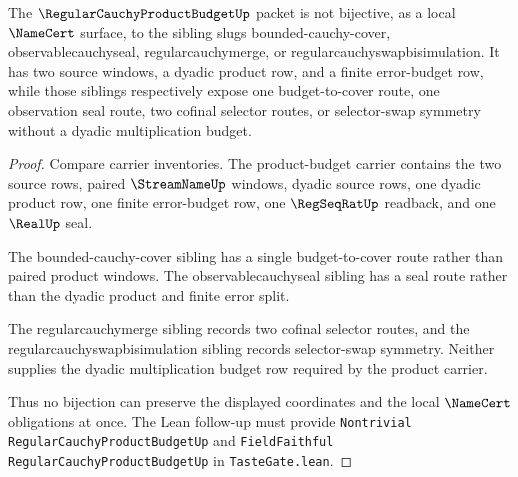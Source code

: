 \begin{theorem}
\label{thm:regular-cauchy-product-budget-independence-witness}
The $\RegularCauchyProductBudgetUp$ packet is not bijective, as a local $\NameCert$ surface, to the sibling slugs bounded-cauchy-cover, observablecauchyseal, regularcauchymerge, or regularcauchyswapbisimulation. It has two source windows, a dyadic product row, and a finite error-budget row, while those siblings respectively expose one budget-to-cover route, one observation seal route, two cofinal selector routes, or selector-swap symmetry without a dyadic multiplication budget.
\end{theorem}
\begin{proof}
Compare carrier inventories. The product-budget carrier contains the two source rows, paired $\StreamNameUp$ windows, dyadic source rows, one dyadic product row, one finite error-budget row, one $\RegSeqRatUp$ readback, and one $\RealUp$ seal.

The bounded-cauchy-cover sibling has a single budget-to-cover route rather than paired product windows. The observablecauchyseal sibling has a seal route rather than the dyadic product and finite error split.

The regularcauchymerge sibling records two cofinal selector routes, and the regularcauchyswapbisimulation sibling records selector-swap symmetry. Neither supplies the dyadic multiplication budget row required by the product carrier.

Thus no bijection can preserve the displayed coordinates and the local $\NameCert$ obligations at once. The Lean follow-up must provide \texttt{Nontrivial RegularCauchyProductBudgetUp} and \texttt{FieldFaithful RegularCauchyProductBudgetUp} in \texttt{TasteGate.lean}.
\end{proof}



